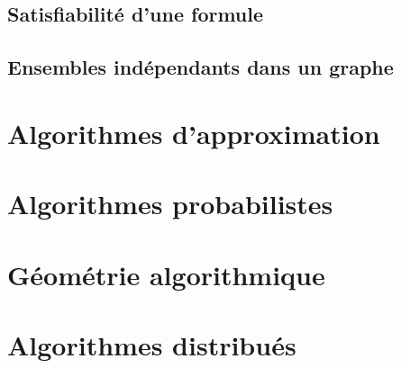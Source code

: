 \documentclass[french]{article}
\begin{document}
\subsection{Satisfiabilité d'une formule}

\subsection{Ensembles indépendants dans un graphe}

\section{Algorithmes d'approximation}

\section{Algorithmes probabilistes}

\section{Géométrie algorithmique}

\section{Algorithmes distribués}
\end{document}
